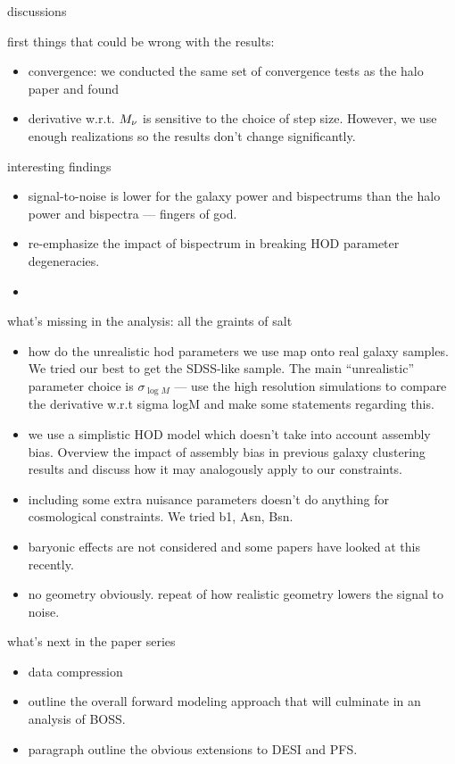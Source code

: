 discussions

first things that could be wrong with the results: 
\begin{itemize}
    \item convergence: we conducted the same set of convergence tests as the halo paper and
        found  
    \item derivative w.r.t. $M_\nu$ is sensitive to the choice of step size.
        However, we use enough realizations so the results don't change
        significantly.  
\end{itemize}

interesting findings 
\begin{itemize}
    \item signal-to-noise is lower for the galaxy power and bispectrums than
        the halo power and bispectra --- fingers of god. 
    \item re-emphasize the impact of bispectrum in breaking HOD parameter
        degeneracies. 
    \item {} 
\end{itemize}

what's missing in the analysis: all the graints of salt
\begin{itemize}
    \item how do the unrealistic hod parameters we use map onto real galaxy
        samples. We tried our best to get the SDSS-like sample. The main
        ``unrealistic'' parameter choice is $\sigma_{\log M}$ --- use the
        high resolution simulations to compare the derivative w.r.t sigma logM
        and make some statements regarding this. 
    \item we use a simplistic HOD model which doesn't take into account
        assembly bias. Overview the impact of assembly bias in previous galaxy
        clustering results and discuss how it may analogously apply to our
        constraints.
    \item including some extra nuisance parameters doesn't do anything for
        cosmological constraints. We tried b1, Asn, Bsn.  
    \item baryonic effects are not considered and some papers have looked at
        this recently. 
    \item no geometry obviously. repeat of how realistic geometry lowers the
        signal to noise. 
\end{itemize}

what's next in the paper series 
\begin{itemize}
    \item data compression 
    \item outline the overall forward modeling approach that will culminate in
        an analysis of BOSS. 
    \item paragraph outline the obvious extensions to DESI and PFS. 
\end{itemize}

